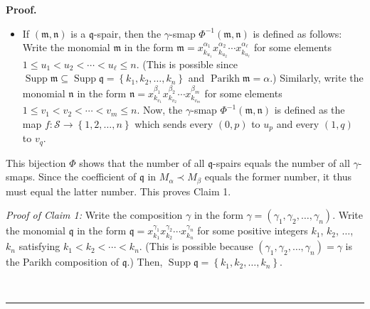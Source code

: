 \documentclass
[numbers=enddot,12pt,final,onecolumn,notitlepage,abstracton]{scrartcl}%
\theoremstyle{definition}
\newenvironment{proof}[1][Proof]{\noindent\textbf{#1.} }{\ \rule{0.5em}{0.5em}}
\newenvironment{verlong}{}{}
\newenvironment{vershort}{}{}
\begin{document}
\begin{proof}
\begin{vershort}
\begin{itemize}
\item If $\left(  \mathfrak{m},\mathfrak{n}\right)  $ is a $\mathfrak{q}%
$-spair, then the $\gamma$-smap $\Phi^{-1}\left(  \mathfrak{m},\mathfrak{n}%
\right)  $ is defined as follows: Write the monomial $\mathfrak{m}$ in the
form $\mathfrak{m}=x_{k_{u_{1}}}^{\alpha_{1}}x_{k_{u_{2}}}^{\alpha_{2}}\cdots
x_{k_{u_{\ell}}}^{\alpha_{\ell}}$ for some elements $1\leq u_{1}<u_{2}%
<\cdots<u_{\ell}\leq n$. (This is possible since $\operatorname*{Supp}%
\mathfrak{m}\subseteq\operatorname*{Supp}\mathfrak{q}=\left\{  k_{1}%
,k_{2},\ldots,k_{n}\right\}  $ and $\operatorname*{Parikh}\mathfrak{m}=\alpha
$.) Similarly, write the monomial $\mathfrak{n}$ in the form $\mathfrak{n}%
=x_{k_{v_{1}}}^{\beta_{1}}x_{k_{v_{2}}}^{\beta_{2}}\cdots x_{k_{v_{m}}}%
^{\beta_{m}}$ for some elements $1\leq v_{1}<v_{2}<\cdots<v_{m}\leq n$. Now,
the $\gamma$-smap $\Phi^{-1}\left(  \mathfrak{m},\mathfrak{n}\right)  $ is
defined as the map $f:\mathcal{S}\rightarrow\left\{  1,2,\ldots,n\right\}  $
which sends every $\left(  0,p\right)  $ to $u_{p}$ and every $\left(
1,q\right)  $ to $v_{q}$.
\end{itemize}

This bijection $\Phi$ shows that the number of all $\mathfrak{q}$-spairs
equals the number of all $\gamma$-smaps. Since the coefficient of
$\mathfrak{q}$ in $M_{\alpha}\left.  \prec\right.  M_{\beta}$ equals the
former number, it thus must equal the latter number. This proves Claim 1.
\end{vershort}

\begin{verlong}
\textit{Proof of Claim 1:} Write the composition $\gamma$ in the form
$\gamma=\left(  \gamma_{1},\gamma_{2},\ldots,\gamma_{n}\right)  $. Write the
monomial $\mathfrak{q}$ in the form $\mathfrak{q}=x_{k_{1}}^{\gamma_{1}%
}x_{k_{2}}^{\gamma_{2}}\cdots x_{k_{n}}^{\gamma_{n}}$ for some positive
integers $k_{1}$, $k_{2}$, $\ldots$, $k_{n}$ satisfying $k_{1}<k_{2}%
<\cdots<k_{n}$. (This is possible because $\left(  \gamma_{1},\gamma
_{2},\ldots,\gamma_{n}\right)  =\gamma$ is the Parikh composition of
$\mathfrak{q}$.) Then, $\operatorname*{Supp}\mathfrak{q}=\left\{  k_{1}%
,k_{2},\ldots,k_{n}\right\}  $.


\end{verlong}
\end{proof}
\end{document}
